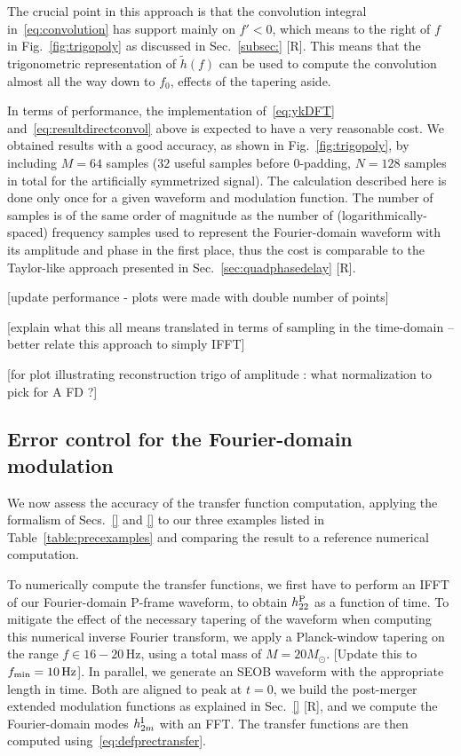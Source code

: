 \documentclass[aps,showpacs,twocolumn,
prd,superscriptaddress,nofootinbib]{revtex4-1}
\newcommand{\Hz}{\,\mathrm{Hz}}
\newcommand{\Msol}{M_{\odot}}
\newcommand{\SM}[1]{{\color{Red} #1}}
\begin{document}
The crucial point in this approach is that the convolution integral in~\eqref{eq:convolution} has support mainly on $f'<0$, which means to the right of $f$ in Fig.~\ref{fig:trigopoly} as discussed in Sec.~\ref{subsec:} \SM{[R]}. This means that the trigonometric representation of $\tilde{h}(f)$ can be used to compute the convolution almost all the way down to $f_{0}$, effects of the tapering aside.

In terms of performance, the implementation of~\eqref{eq:ykDFT} and~\eqref{eq:resultdirectconvol} above is expected to have a very reasonable cost. We obtained results with a good accuracy, as shown in Fig.~\ref{fig:trigopoly}, by including $M=64$ samples ($32$ useful samples before 0-padding, $N=128$ samples in total for the artificially symmetrized signal). The calculation described here is done only once for a given waveform and modulation function. The number of samples is of the same order of magnitude as the number of (logarithmically-spaced) frequency samples used to represent the Fourier-domain waveform with its amplitude and phase in the first place, thus the cost is comparable to the Taylor-like approach presented in Sec.~\ref{sec:quadphasedelay} \SM{[R]}.

\SM{[update performance - plots were made with double number of points]}

\SM{[explain what this all means translated in terms of sampling in the time-domain -- better relate this approach to simply IFFT]}

\SM{[for plot illustrating reconstruction trigo of amplitude : what normalization to pick for A FD ?]}


\subsection{Error control for the Fourier-domain modulation}
\label{subsec:errorsPrec}

We now assess the accuracy of the transfer function computation, applying the formalism of Secs.~\ref{} and \ref{} to our three examples listed in Table~\ref{table:precexamples} and comparing the result to a reference numerical computation.

To numerically compute the transfer functions, we first have to perform an IFFT of our Fourier-domain P-frame waveform, to obtain $h^{\rm P}_{22}$ as a function of time. To mitigate the effect of the necessary tapering of the waveform when computing this numerical inverse Fourier transform, we apply a Planck-window tapering on the range $f\in 16-20 \Hz$, using a total mass of $M=20 \Msol$. \SM{[Update this to $f_{\rm min} = 10\Hz$]}. In parallel, we generate an SEOB waveform with the appropriate length in time. Both are aligned to peak at $t=0$, we build the post-merger extended modulation functions as explained in Sec.~\ref{} \SM{[R]}, and we compute the Fourier-domain modes $h^{\rm I}_{2m}$ with an FFT. The transfer functions are then computed using~\eqref{eq:defprectransfer}.
\end{document}
